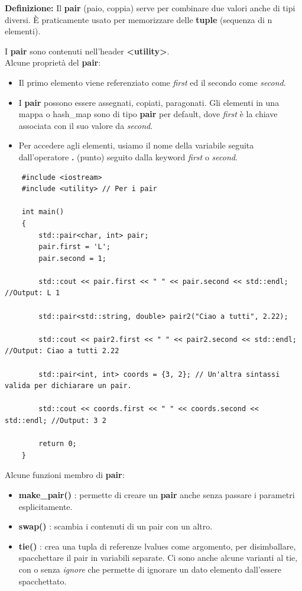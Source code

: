 \textsf{\small \textbf{Definizione: } Il \textbf{pair} (paio, coppia) serve per combinare due valori anche di tipi diversi. È praticamente usato per memorizzare delle \textbf{tuple} (sequenza di n elementi).} \break

\textsf{\small I \textbf{pair} sono contenuti nell'header \textbf{<utility>}.} \\

\textsf{\small Alcune proprietà del \textbf{pair}: } \\

\begin{itemize}
	\item \textsf{\small Il primo elemento viene referenziato come \emph{first} ed il secondo come \emph{second}.}
	\item \textsf{\small I \textbf{pair} possono essere assegnati, copiati, paragonati. Gli elementi in una mappa o hash\_map sono di tipo \textbf{pair} per default, dove \emph{first} è la chiave associata con il suo valore da \emph{second}.}
	\item \textsf{\small Per accedere agli elementi, usiamo il nome della variabile seguita dall'operatore \textbf{.} (punto) seguito dalla keyword \emph{first} o \emph{second}.}
\end{itemize}

\begin{lstlisting}
	#include <iostream>
	#include <utility> // Per i pair
	
	int main()
	{
		std::pair<char, int> pair;
		pair.first = 'L';
		pair.second = 1;
		
		std::cout << pair.first << " " << pair.second << std::endl; //Output: L 1
		
		std::pair<std::string, double> pair2("Ciao a tutti", 2.22);
		
		std::cout << pair2.first << " " << pair2.second << std::endl; //Output: Ciao a tutti 2.22
		
		std::pair<int, int> coords = {3, 2}; // Un'altra sintassi valida per dichiarare un pair.
		
		std::cout << coords.first << " " << coords.second << std::endl; //Output: 3 2
		
		return 0;
	}
\end{lstlisting}

\textsf{\small Alcune funzioni membro di \textbf{pair}: } \\

\begin{itemize}
	\item \textsf{\small \textbf{make\_pair()} : permette di creare un \textbf{pair} anche senza passare i parametri esplicitamente.}
	\item \textsf{\small \textbf{swap()} : scambia i contenuti di un pair con un altro.}
	\item \textsf{\small \textbf{tie()} : crea una tupla di referenze lvalues come argomento, per disimballare, spacchettare il pair in variabili separate. Ci sono anche alcune varianti al tie, con o senza \emph{ignore} che permette di ignorare un dato elemento dall'essere spacchettato.}
\end{itemize}

